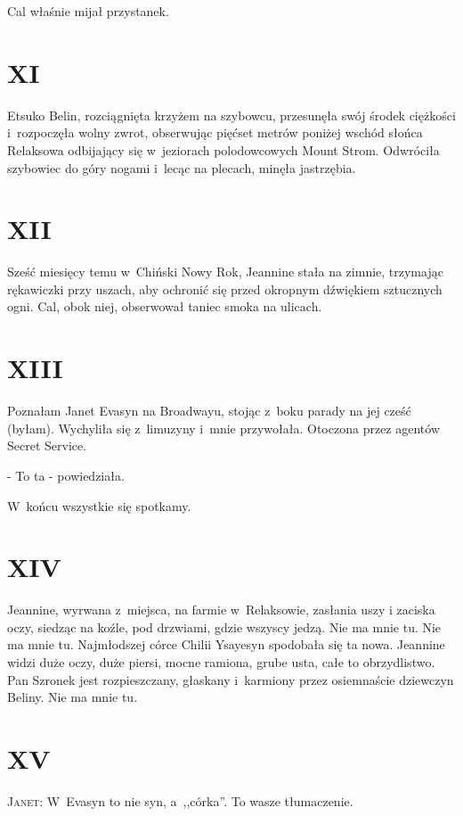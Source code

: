 \documentclass[oneside,polish,12pt,sfheadings]{mwbk}
\begin{document}
Cal właśnie mijał przystanek.

\chapter{XI}

Etsuko Belin, rozciągnięta krzyżem na szybowcu, przesunęła swój środek
ciężkości i~rozpoczęła wolny zwrot, obserwując pięćset metrów poniżej
wschód słońca Relaksowa odbijający się w~jeziorach polodowcowych Mount
Strom. Odwróciła szybowiec do góry nogami i~lecąc na plecach, minęła
jastrzębia.

\chapter{XII}

Sześć miesięcy temu w~Chiński Nowy Rok, Jeannine stała na zimnie,
trzymając rękawiczki przy uszach, aby ochronić się przed okropnym
dźwiękiem sztucznych ogni. Cal, obok niej, obserwował taniec smoka
na ulicach. 

\chapter{XIII}

Poznałam Janet Evasyn na Broadwayu, stojąc z~boku parady na jej cześć
(byłam). Wychyliła się z~limuzyny i~mnie przywołała. Otoczona przez
agentów Secret Service. 

- To ta - powiedziała. 

W~końcu wszystkie się spotkamy.

\chapter{XIV}

Jeannine, wyrwana z~miejsca, na farmie w~Relaksowie, zasłania uszy
i zaciska oczy, siedząc na koźle, pod drzwiami, gdzie wszyscy jedzą.
Nie ma mnie tu. Nie ma mnie tu. Najmłodszej córce Chilii Ysayesyn
spodobała się ta nowa. Jeannine widzi duże oczy, duże piersi, mocne
ramiona, grube usta, całe to obrzydlistwo. Pan Szronek jest rozpieszczany,
głaskany i~karmiony przez osiemnaście dziewczyn Beliny. Nie ma mnie
tu.

\chapter{XV}

\textsc{Janet}: W~Evasyn to nie syn, a~,,córka''. To wasze tłumaczenie.
\end{document}
